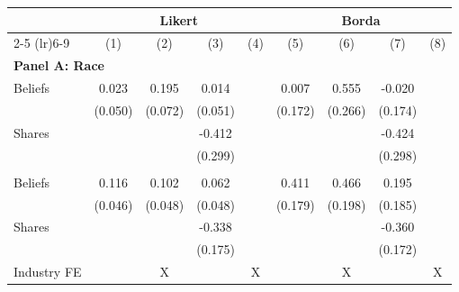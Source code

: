 \begin{tabular}{lcccccccc}
\toprule
 & \multicolumn{4}{c}{Likert} & \multicolumn{4}{c}{Borda} \\
\cmidrule(lr){2-5} \cmidrule(lr){6-9}
 & (1) & (2) & (3) & (4) & (5) & (6) & (7) & (8)
\\
\midrule
\multicolumn{9}{l}{\textbf{Panel A: Race}} \\
Beliefs & 0.023 & 0.195 & 0.014 &  & 0.007 & 0.555 & -0.020 & 
\\
 & (0.050) & (0.072) & (0.051) &  & (0.172) & (0.266) & (0.174) & 
\\
Shares &  &  & -0.412 &  &  &  & -0.424 & 
\\
 &  &  & (0.299) &  &  &  & (0.298) & 
\\
\addlinespace
\multicolumn{9}{l}{\textbf{Panel B: Gender}} \\
Beliefs & 0.116 & 0.102 & 0.062 &  & 0.411 & 0.466 & 0.195 & 
\\
 & (0.046) & (0.048) & (0.048) &  & (0.179) & (0.198) & (0.185) & 
\\
Shares &  &  & -0.338 &  &  &  & -0.360 & 
\\
 &  &  & (0.175) &  &  &  & (0.172) & 
\\
\addlinespace
Industry FE &  & X &  & X &  & X &  & X
\\
\bottomrule
\end{tabular}
